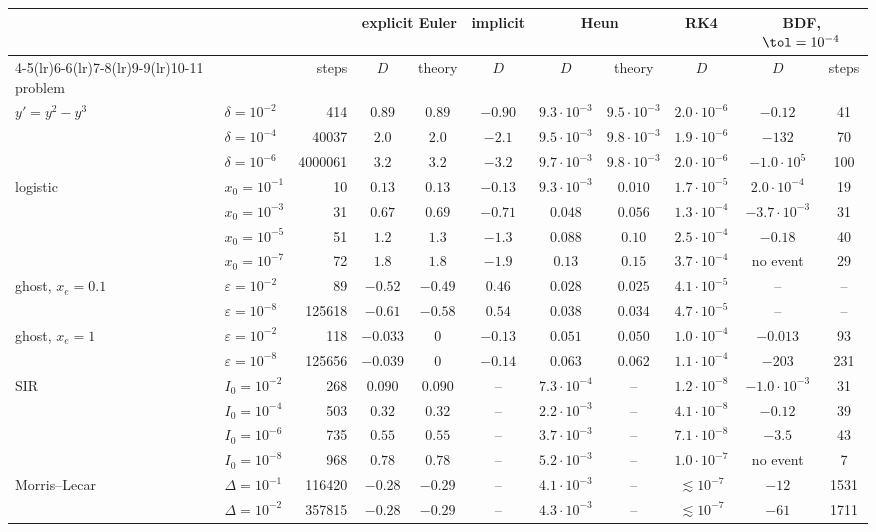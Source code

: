 \begin{tabular}{llrcccccccc}
\toprule
& & & \multicolumn{2}{c}{explicit Euler} & implicit & \multicolumn{2}{c}{Heun} & RK4 & \multicolumn{2}{c}{BDF, $\tol=10^{-4}$}\\
\cmidrule(lr){4-5}\cmidrule(lr){6-6}\cmidrule(lr){7-8}\cmidrule(lr){9-9}\cmidrule(lr){10-11}
problem & & steps & $D$ & theory & $D$ & $D$ & theory & $D$ & $D$ & steps\\
\midrule
$y'=y^2-y^3$ & $\delta=10^{-2}$ & 414 & $0.89$ & $0.89$ & $-0.90$ & $9.3\cdot10^{-3}$ & $9.5\cdot10^{-3}$ & $2.0\cdot10^{-6}$ & $-0.12$ & 41\\
 & $\delta=10^{-4}$ & 40037 & $2.0$ & $2.0$ & $-2.1$ & $9.5\cdot10^{-3}$ & $9.8\cdot10^{-3}$ & $1.9\cdot10^{-6}$ & $-132$ & 70\\
 & $\delta=10^{-6}$ & 4000061 & $3.2$ & $3.2$ & $-3.2$ & $9.7\cdot10^{-3}$ & $9.8\cdot10^{-3}$ & $2.0\cdot10^{-6}$ & $-1.0\cdot10^{5}$ & 100\\
\addlinespace[2pt]
logistic & $x_0=10^{-1}$ & 10 & $0.13$ & $0.13$ & $-0.13$ & $9.3\cdot10^{-3}$ & $0.010$ & $1.7\cdot10^{-5}$ & $2.0\cdot10^{-4}$ & 19\\
 & $x_0=10^{-3}$ & 31 & $0.67$ & $0.69$ & $-0.71$ & $0.048$ & $0.056$ & $1.3\cdot10^{-4}$ & $-3.7\cdot10^{-3}$ & 31\\
 & $x_0=10^{-5}$ & 51 & $1.2$ & $1.3$ & $-1.3$ & $0.088$ & $0.10$ & $2.5\cdot10^{-4}$ & $-0.18$ & 40\\
 & $x_0=10^{-7}$ & 72 & $1.8$ & $1.8$ & $-1.9$ & $0.13$ & $0.15$ & $3.7\cdot10^{-4}$ & no event & 29\\
\addlinespace[2pt]
ghost, $x_e=0.1$ & $\varepsilon=10^{-2}$ & 89 & $-0.52$ & $-0.49$ & $0.46$ & $0.028$ & $0.025$ & $4.1\cdot10^{-5}$ & -- & --\\
 & $\varepsilon=10^{-8}$ & 125618 & $-0.61$ & $-0.58$ & $0.54$ & $0.038$ & $0.034$ & $4.7\cdot10^{-5}$ & -- & --\\
\addlinespace[2pt]
ghost, $x_e=1$ & $\varepsilon=10^{-2}$ & 118 & $-0.033$ & $0$ & $-0.13$ & $0.051$ & $0.050$ & $1.0\cdot10^{-4}$ & $-0.013$ & 93\\
 & $\varepsilon=10^{-8}$ & 125656 & $-0.039$ & $0$ & $-0.14$ & $0.063$ & $0.062$ & $1.1\cdot10^{-4}$ & $-203$ & 231\\
\addlinespace[2pt]
SIR & $I_0=10^{-2}$ & 268 & $0.090$ & $0.090$ & -- & $7.3\cdot10^{-4}$ & -- & $1.2\cdot10^{-8}$ & $-1.0\cdot10^{-3}$ & 31\\
 & $I_0=10^{-4}$ & 503 & $0.32$ & $0.32$ & -- & $2.2\cdot10^{-3}$ & -- & $4.1\cdot10^{-8}$ & $-0.12$ & 39\\
 & $I_0=10^{-6}$ & 735 & $0.55$ & $0.55$ & -- & $3.7\cdot10^{-3}$ & -- & $7.1\cdot10^{-8}$ & $-3.5$ & 43\\
 & $I_0=10^{-8}$ & 968 & $0.78$ & $0.78$ & -- & $5.2\cdot10^{-3}$ & -- & $1.0\cdot10^{-7}$ & no event & 7\\
\addlinespace[2pt]
Morris--Lecar & $\Delta=10^{-1}$ & 116420 & $-0.28$ & $-0.29$ & -- & $4.1\cdot10^{-3}$ & -- & $\lesssim10^{-7}$ & $-12$ & 1531\\
 & $\Delta=10^{-2}$ & 357815 & $-0.28$ & $-0.29$ & -- & $4.3\cdot10^{-3}$ & -- & $\lesssim10^{-7}$ & $-61$ & 1711\\
\bottomrule
\end{tabular}
